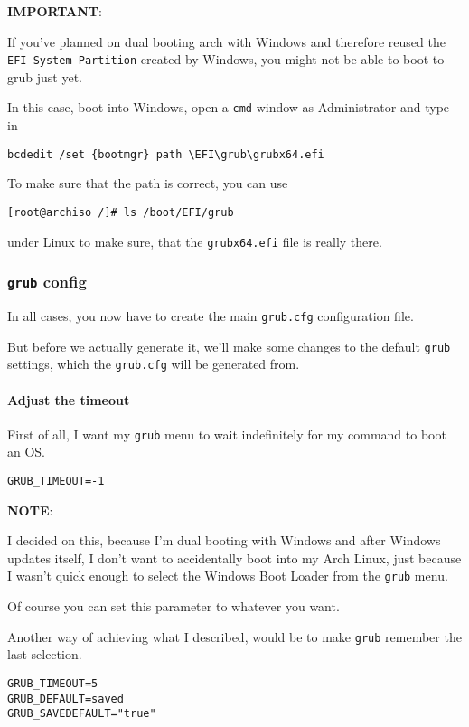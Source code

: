 \documentclass[9pt]{report}
\newcommand{\admonition}[2]{\textbf{#1}: {#2}}
\begin{document}
\admonition{IMPORTANT}{If you’ve planned on dual booting arch with Windows and therefore reused the \texttt{EFI System Partition} created by Windows, you might not be able to boot to grub just yet.


In this case, boot into Windows, open a \texttt{cmd} window as Administrator and type in


}
\begin{verbatim}
bcdedit /set {bootmgr} path \EFI\grub\grubx64.efi
\end{verbatim}

To make sure that the path is correct, you can use


\begin{verbatim}
[root@archiso /]# ls /boot/EFI/grub
\end{verbatim}

under Linux to make sure, that the \texttt{grubx64.efi} file is really there.


\vfill\eject

\hypertarget{x-grub-config}{\subsubsection{\texttt{grub} config}}
In all cases, you now have to create the main \texttt{grub.cfg} configuration file.


But before we actually generate it, we’ll make some changes to the default \texttt{grub} settings, which the \texttt{grub.cfg} will be generated from.



\vfill\eject

\hypertarget{x-adjust-the-timeout}{\paragraph{Adjust the timeout}}
First of all, I want my \texttt{grub} menu to wait indefinitely for my command to boot an OS.


\begin{verbatim}
GRUB_TIMEOUT=-1
\end{verbatim}

\admonition{NOTE}{I decided on this, because I’m dual booting with Windows and after Windows updates itself, I don’t want to accidentally boot into my Arch Linux, just because I wasn’t quick enough to select the Windows Boot Loader from the \texttt{grub} menu.


Of course you can set this parameter to whatever you want.


Another way of achieving what I described, would be to make \texttt{grub} remember the last selection.


}
\begin{verbatim}
GRUB_TIMEOUT=5
GRUB_DEFAULT=saved
GRUB_SAVEDEFAULT="true"
\end{verbatim}
\end{document}
